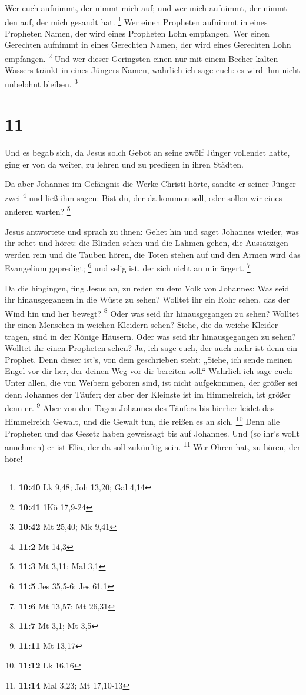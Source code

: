  Wer euch aufnimmt, der nimmt mich auf; und wer mich
aufnimmt, der nimmt den auf, der mich gesandt hat. \footnote{\textbf{10:40}
  Lk 9,48; Joh 13,20; Gal 4,14}  Wer einen Propheten
aufnimmt in eines Propheten Namen, der wird eines Propheten Lohn
empfangen. Wer einen Gerechten aufnimmt in eines Gerechten Namen, der
wird eines Gerechten Lohn empfangen. \footnote{\textbf{10:41} 1Kö
  17,9-24}  Und wer dieser Geringsten einen nur mit einem
Becher kalten Wassers tränkt in eines Jüngers Namen, wahrlich ich sage
euch: es wird ihm nicht unbelohnt bleiben. \footnote{\textbf{10:42} Mt
  25,40; Mk 9,41}

\hypertarget{section-7}{%
\section{11}\label{section-7}}

 Und es begab sich, da Jesus solch Gebot an seine zwölf
Jünger vollendet hatte, ging er von da weiter, zu lehren und zu predigen
in ihren Städten.

 Da aber Johannes im Gefängnis die Werke Christi hörte,
sandte er seiner Jünger zwei \footnote{\textbf{11:2} Mt 14,3}
 und ließ ihm sagen: Bist du, der da kommen soll, oder
sollen wir eines anderen warten? \footnote{\textbf{11:3} Mt 3,11; Mal
  3,1}

 Jesus antwortete und sprach zu ihnen: Gehet hin und saget
Johannes wieder, was ihr sehet und höret:  die Blinden
sehen und die Lahmen gehen, die Aussätzigen werden rein und die Tauben
hören, die Toten stehen auf und den Armen wird das Evangelium gepredigt;
\footnote{\textbf{11:5} Jes 35,5-6; Jes 61,1}  und selig
ist, der sich nicht an mir ärgert. \footnote{\textbf{11:6} Mt 13,57; Mt
  26,31}

 Da die hingingen, fing Jesus an, zu reden zu dem Volk von
Johannes: Was seid ihr hinausgegangen in die Wüste zu sehen? Wolltet ihr
ein Rohr sehen, das der Wind hin und her bewegt? \footnote{\textbf{11:7}
  Mt 3,1; Mt 3,5}  Oder was seid ihr hinausgegangen zu
sehen? Wolltet ihr einen Menschen in weichen Kleidern sehen? Siehe, die
da weiche Kleider tragen, sind in der Könige Häusern. 
Oder was seid ihr hinausgegangen zu sehen? Wolltet ihr einen Propheten
sehen? Ja, ich sage euch, der auch mehr ist denn ein Prophet.
 Denn dieser ist's, von dem geschrieben steht: „Siehe,
ich sende meinen Engel vor dir her, der deinen Weg vor dir bereiten
soll.``  Wahrlich ich sage euch: Unter allen, die von
Weibern geboren sind, ist nicht aufgekommen, der größer sei denn
Johannes der Täufer; der aber der Kleinste ist im Himmelreich, ist
größer denn er. \footnote{\textbf{11:11} Mt 13,17}  Aber
von den Tagen Johannes des Täufers bis hierher leidet das Himmelreich
Gewalt, und die Gewalt tun, die reißen es an sich. \footnote{\textbf{11:12}
  Lk 16,16}  Denn alle Propheten und das Gesetz haben
geweissagt bis auf Johannes.  Und (so ihr's wollt
annehmen) er ist Elia, der da soll zukünftig sein. \footnote{\textbf{11:14}
  Mal 3,23; Mt 17,10-13}  Wer Ohren hat, zu hören, der
höre!

